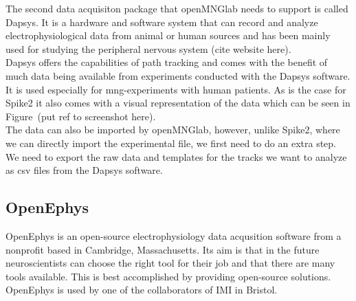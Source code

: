 The second data acquisiton package that openMNGlab needs to support is called Dapsys. It is a hardware and software system that can record and analyze electrophysiological data from animal or human sources and has been mainly used for studying the peripheral nervous system (cite website here). \\
Dapsys offers the capabilities of path tracking and comes with the benefit of much data being available from experiments conducted with the Dapsys software. It is used especially for mng-experiments with human patients. As is the case for Spike2 it also comes with a visual representation of the data which can be seen in Figure~(put ref to screenshot here).\\
The data can also be imported by openMNGlab, however, unlike Spike2, where we can directly import the experimental file, we first need to do an extra step. We need to export the raw data and templates for the tracks we want to analyze as csv files from the Dapsys software.\\


\subsection{OpenEphys}
OpenEphys is an open-source electrophysiology data acqusition software from a nonprofit based in Cambridge, Massachusetts. Its aim is that in the future neuroscientists can choose the right tool for their job and that there are many tools available. This is best accomplished by providing open-source solutions.
OpenEphys is used by one of the collaborators of IMI in Bristol.

 
\cleardoublepage
